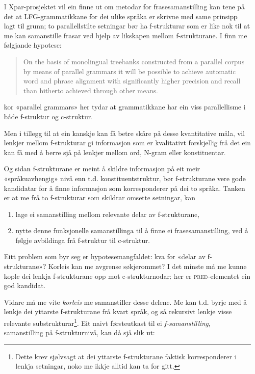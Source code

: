 \documentclass[12pt,a4paper,oneside,draft]{report}
\newcommand{\F}[2]{\textsc{#1}\ensuremath{_{#2}}}
\newcommand{\PRED}{\F{pred}{}}
\begin{document}
I Xpar-prosjektet vil ein finne ut om metodar for frasesamanstilling
 kan tene på det at LFG-grammatikkane for dei ulike språka er skrivne
 med same prinsipp lagt til grunn; to parallellstilte setningar bør ha
 f\hyp{}strukturar som er like nok til at me kan samanstille frasar ved
 hjelp av likskapen mellom f\hyp{}strukturane. I
 \citet[s.~72]{dyvik2009lmp} finn me følgjande hypotese:

\begin{quote}
 On the basis of monolingual treebanks constructed from a parallel
 corpus by means of parallel grammars it will be possible to achieve
 automatic word and phrase alignment with significantly higher
 precision and recall than hitherto achieved through other means.
\end{quote}

kor «parallel grammars» her tydar at grammatikkane har ein viss
 parallellisme i både f\hyp{}struktur og c\hyp{}struktur.

Men i tillegg til at ein kanskje kan få betre skåre på desse
 kvantitative måla, vil lenkjer mellom f\hyp{}strukturar gi informasjon som
 er kvalitativt forskjellig frå det ein kan få med å berre sjå på
 lenkjer mellom ord, N-gram eller konstituentar.


Og sidan f\hyp{}strukturane er meint å skildre informasjon på eit meir
 «språkuavhengig» nivå enn t.d. konstituentstruktur, bør f\hyp{}strukturane
 vere gode kandidatar for å finne informasjon som korresponderer på
 dei to språka. Tanken er at me frå to f\hyp{}strukturar som skildrar
 omsette setningar, kan
\begin{enumerate}
\item lage ei samanstilling mellom relevante delar av f\hyp{}strukturane,
\item nytte denne funksjonelle samanstillinga til å finne ei
   frasesamanstilling, ved å følgje avbildinga frå f\hyp{}struktur til
   c\hyp{}struktur.
\end{enumerate}
Eitt problem som byr seg er hypotesemangfaldet: kva for «delar av
 f\hyp{}strukturane»? Korleis kan me avgrense søkjerommet? I det minste må
 me kunne kople dei lenkja f\hyp{}strukturane opp mot c\hyp{}strukturnodar; her
 er \PRED{}-elementet ein god kandidat.

Vidare må me vite \emph{korleis} me samanstiller desse delene. Me kan
 t.d. byrje med å lenkje dei yttarste f\hyp{}strukturane frå kvart språk,
 og så rekursivt lenkje visse relevante substrukturar\footnote{Dette krev sjølvsagt at dei yttarste f\hyp{}strukturane faktisk
        korresponderer i lenkja setningar, noko me ikkje alltid kan ta
        for gitt. }.  Eit
 naivt førsteutkast til ei \emph{f-samanstilling}, samanstilling på
 f\hyp{}strukturnivå, kan då sjå slik ut:
\end{document}
